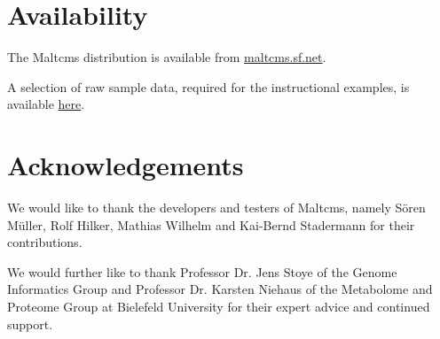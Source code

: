 \section*{Availability}
The Maltcms distribution is available from \url{maltcms.sf.net}.

\noindent A selection of raw sample data, required for the instructional examples, is available \href{http://sourceforge.net/projects/maltcms/files/maltcms/example-data/}{here}.

\section*{Acknowledgements}
We would like to thank the developers and testers of Maltcms, namely S\"oren M\"uller, Rolf Hilker, Mathias Wilhelm and Kai-Bernd Stadermann for their contributions.

We would further like to thank Professor Dr. Jens Stoye of the Genome Informatics Group and Professor Dr. Karsten Niehaus of the Metabolome and Proteome Group at Bielefeld University for their expert advice and continued support.